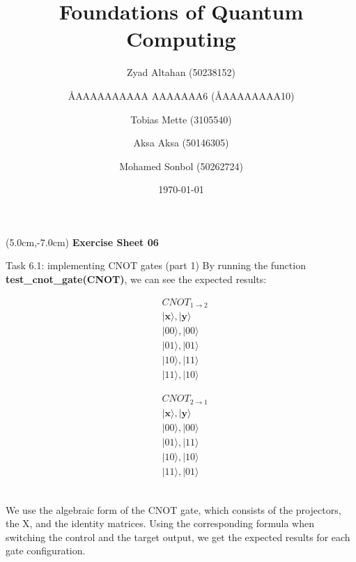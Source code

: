 \documentclass[aspectratio=169]{beamer}
\title{Foundations of Quantum Computing}
\author[]{Zyad Altahan (50238152) \and \AA{AAAAAAAAAA AAAAAAA}{6} (\AA{AAAAAAAA}{10}) \and Tobias Mette (3105540) \and Aksa Aksa (50146305) \and Mohamed Sonbol (50262724)}
\institute[]{Department of Computer Science \\ University of Bonn}
\date{\today}
\begin{document}
\begin{frame}
    \titlepage
    \begin{textblock*}{8cm}(5.0cm,-7.0cm)
        {\large \color{uwopurple}\hspace{0.66cm} \textbf{Exercise Sheet 06}} %
    \end{textblock*}
\end{frame}


\begin{frame}{Task 6.1: implementing CNOT gates (part 1)}
By running the function \textbf{test\_cnot\_gate(CNOT)}, we can see the expected results:\\
\begin{minipage}{0.45\textwidth}
    \begin{align*}
        & CNOT_{1\xrightarrow{}2} \\
        & |\textbf{x}\rangle, |\textbf{y}\rangle\\
        & |00\rangle, |00\rangle \\
        & |01\rangle, |01\rangle \\
        & |10\rangle, |11\rangle \\
        & |11\rangle, |10\rangle
    \end{align*}
\end{minipage}
\hfill
\begin{minipage}{0.45\textwidth}
    \begin{align*}
        & CNOT_{2\xrightarrow{}1} \\
        & |\textbf{x}\rangle, |\textbf{y}\rangle\\
        & |00\rangle, |00\rangle \\
        & |01\rangle, |11\rangle \\
        & |10\rangle, |10\rangle \\
        & |11\rangle, |01\rangle
    \end{align*}
\end{minipage}\\
We use the algebraic form of the CNOT gate, which consists of the projectors, the X, and the identity matrices. Using the corresponding formula when switching the control and the target output, we get the expected results for each gate configuration.
\end{frame}
\end{document}
